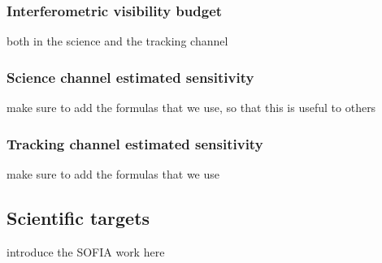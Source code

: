 \subsubsection{Interferometric visibility budget}
both in the science and the tracking channel
\subsubsection{Science channel estimated sensitivity}
make sure to add the formulas that we use, so that this is useful to others

\subsubsection{Tracking channel estimated sensitivity}
make sure to add the formulas that we use

\subsection{Scientific targets}

introduce the SOFIA work here

